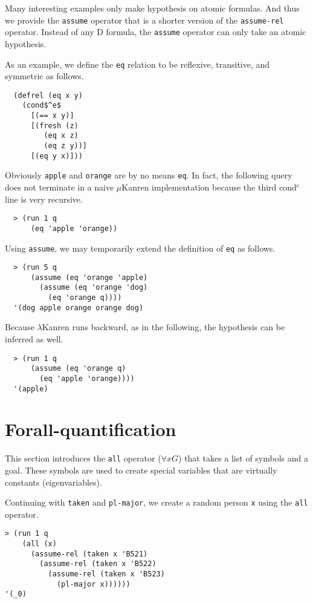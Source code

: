 \documentclass[acmlarge,review]{acmart}
\theoremstyle{definition}
\begin{document}
Many interesting examples only make hypothesis on atomic formulas. And thus we
provide the \texttt{assume} operator that is a shorter version of the
\texttt{assume-rel} operator. Instead of any D formula, the \texttt{assume}
operator can only take an atomic hypothesis.

As an example, we define the \texttt{eq} relation to be reflexive, transitive,
and symmetric as follows.
\begin{lstlisting}
  (defrel (eq x y)
    (cond$^e$
      [(== x y)]
      [(fresh (z)
         (eq x z)
         (eq z y))]
      [(eq y x)]))
\end{lstlisting}
Obviously \texttt{apple} and \texttt{orange} are by no means \texttt{eq}. 
In fact, the following query does not terminate in a naive $\mu$Kanren
implementation because the third cond$^e$ line is very recursive.
\begin{lstlisting}
  > (run 1 q
      (eq 'apple 'orange))
\end{lstlisting}

\clearpage

Using \texttt{assume}, we may temporarily extend the definition of
\texttt{eq} as follows.
\begin{lstlisting}
  > (run 5 q
      (assume (eq 'orange 'apple)
        (assume (eq 'orange 'dog)  
          (eq 'orange q))))
  '(dog apple orange orange dog)
\end{lstlisting}

Because $\lambda$Kanren runs backward, as in the following,
the hypothesis can be inferred as well.
\begin{lstlisting}
  > (run 1 q
      (assume (eq 'orange q)
        (eq 'apple 'orange))))
  '(apple)
\end{lstlisting}

\section{Forall-quantification}
This section introduces the \texttt{all} operator ($\forall x G$) that takes
a list of symbols and a goal. These symbols are used to create special
variables that are virtually constants (eigenvariables).

Continuing with \texttt{taken} and \texttt{pl-major},
we create a random person \texttt{x} using the \texttt{all} operator.
\begin{lstlisting}
> (run 1 q
    (all (x)
      (assume-rel (taken x 'B521)
        (assume-rel (taken x 'B522)
          (assume-rel (taken x 'B523)
            (pl-major x))))))
'(_0)
\end{lstlisting}
\end{document}
